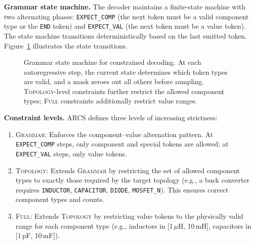 \documentclass[conference]{IEEEtran}
\begin{document}
\textbf{Grammar state machine.} The decoder maintains a finite-state machine
with two alternating phases:
\texttt{EXPECT\_COMP} (the next token must be a valid component type
or the \texttt{END} token) and \texttt{EXPECT\_VAL} (the next token
must be a value token). The state machine transitions deterministically
based on the last emitted token.
Figure~\ref{fig:fsm} illustrates the state transitions.

\begin{figure}[t]
\centering
{}
\caption{Grammar state machine for constrained decoding. At each
autoregressive step, the current state determines which token types
are valid, and a mask zeroes out all others before sampling.
\textsc{Topology}-level constraints further restrict the allowed
component types; \textsc{Full} constraints additionally restrict
value ranges.}
\label{fig:fsm}
\end{figure}

\textbf{Constraint levels.} ARCS defines three levels of increasing
strictness:
\begin{enumerate}
    \item \textsc{Grammar}: Enforces the component--value alternation
    pattern. At \texttt{EXPECT\_COMP} steps, only component and special
    tokens are allowed; at \texttt{EXPECT\_VAL} steps, only value tokens.
    \item \textsc{Topology}: Extends \textsc{Grammar} by restricting
    the set of allowed component types to exactly those required by the
    target topology (e.g., a buck converter requires \texttt{INDUCTOR},
    \texttt{CAPACITOR}, \texttt{DIODE}, \texttt{MOSFET\_N}). This
    ensures correct component types and counts.
    \item \textsc{Full}: Extends \textsc{Topology} by restricting value
    tokens to the physically valid range for each component type
    (e.g., inductors in [1\,$\mu$H, 10\,mH], capacitors in
    [1\,pF, 10\,mF]).
\end{enumerate}
\end{document}

